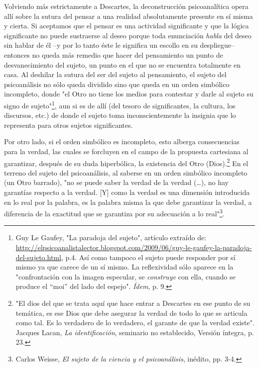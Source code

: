 \documentclass{book}
\begin{document}
Volviendo más estrictamente a Descartes, la deconstrucción
psicoanalítica opera allí sobre la sutura del pensar a una realidad
absolutamente presente en sí misma y cierta. Si aceptamos que el pensar
es una actividad significante y que la lógica significante no puede
sustraerse al deseo porque toda enunciación \emph{habla} del deseo sin
hablar de él --y por lo tanto éste le significa un escollo en su
despliegue-- entonces no queda más remedio que hacer del pensamiento un
punto de desvanecimiento del sujeto, un punto en el que no se encuentra
totalmente en casa. Al deshilar la sutura del ser del sujeto al
pensamiento, el sujeto del psicoanálisis no sólo queda dividido sino que
queda en un orden simbólico incompleto, donde "el Otro no tiene los
medios para contestar y darle al sujeto su signo de sujeto"\footnote{Guy
  Le Gaufey, "La paradoja del sujeto", artículo extraído de:
  \url{http://elpsicoanalistalector.blogspot.com/2009/06/guy-le-gaufey-la-paradoja-del-sujeto.html},
  p.4. Así como tampoco el sujeto puede responder por sí mismo ya que
  carece de un sí mismo. La reflexividad sólo aparece en la
  "confrontación con la imagen especular, se \emph{construye} con ella,
  cuando se produce el ``moi'' del lado del espejo". \emph{Ídem}, p. 9.},
aun si es de allí (del tesoro de significantes, la cultura, los
discursos, etc.) de donde el sujeto toma inconscientemente la insignia
que lo representa para otros sujetos significantes.

Por otro lado, si el orden simbólico es incompleto, esto alberga
consecuencias para la verdad, las cuales se forcluyen en el campo de la
propuesta cartesiana al garantizar, después de su duda hiperbólica, la
existencia del Otro (Dios).\footnote{"El dios del que se trata aquí que
  hace entrar a Descartes en ese punto de su temática, es ese Dios que
  debe asegurar la verdad de todo lo que se articula como tal. Es lo
  verdadero de lo verdadero, el garante de que la verdad existe".
  Jacques Lacan, \emph{La identificación}, seminario no establecido,
  Versión íntegra, p. 23.} En el terreno del sujeto del psicoanálisis,
al saberse en un orden simbólico incompleto (un Otro barrado), "no se
puede saber la verdad de la verdad (\ldots), no hay garantías respecto a
la verdad. {[}Y{]} como la verdad es una dimensión introducida en lo
real por la palabra, es la palabra misma la que debe garantizar la
verdad, a diferencia de la exactitud que se garantiza por su adecuación
a lo real"\footnote{Carlos Weisse, \emph{El sujeto de la ciencia y el
  psicoanálisis}, inédito, pp. 3-4.}.
\end{document}
